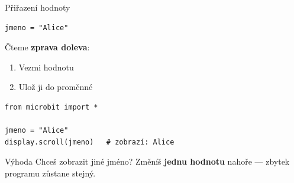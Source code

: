 \begin{frame}[fragile]{Přiřazení hodnoty}

  \begin{lstlisting}
jmeno = "Alice"
  \end{lstlisting}

  \bigskip
  Čteme \textbf{zprava doleva}:
  \begin{enumerate}
    \item Vezmi hodnotu 
    \item Ulož ji do proměnné 
  \end{enumerate}

  \bigskip
  \begin{lstlisting}
from microbit import *

jmeno = "Alice"
display.scroll(jmeno)   # zobrazí: Alice
  \end{lstlisting}

  \pause\bigskip
  \begin{alertblock}{Výhoda}
    Chceš zobrazit jiné jméno? Změníš \textbf{jednu hodnotu} nahoře —
    zbytek programu zůstane stejný.
  \end{alertblock}
\end{frame}

